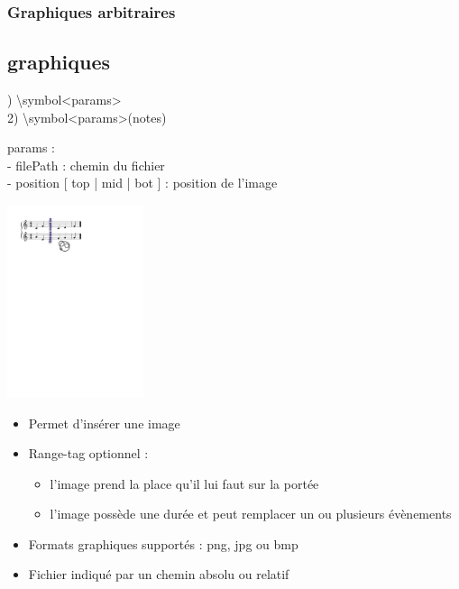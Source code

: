 \documentclass[12pt]{beamer}
\newenvironment{code}
  {\fontfamily{prc}\selectfont}{}
\begin{document}
    \begin{frame}
    \frametitle{Graphiques arbitraires}
    \subsection{graphiques}
   
    \begin{code} 
    1) \textbackslash{}symbol\textless{}params\textgreater{}\\
    2) \textbackslash{}symbol\textless{}params\textgreater{}(notes)\\
   \end{code}
    
    \begin{multicols}{2}
    
   \begin{code}
    params :\\
     - filePath : chemin du fichier\\
     - position  [ top | mid | bot ] : position de l’image
    \end{code}
    
    \columnbreak
    
   \hspace{1cm}  \includegraphics[width=4cm]{img/partitions/symbol.pdf}
    
    \end{multicols}
    
    \vspace{-3mm}
    \begin{itemize}
      \item Permet d'insérer une image
      \item Range-tag optionnel : \begin{itemize}
        \item l'image prend la place qu'il lui faut sur la portée
        \item l'image possède une durée et peut remplacer un ou plusieurs évènements
      \end{itemize}
      \item Formats graphiques supportés : png, jpg ou bmp
      \item Fichier indiqué par un chemin absolu ou relatif
    \end{itemize}
    
    \end{frame}
\end{document}
